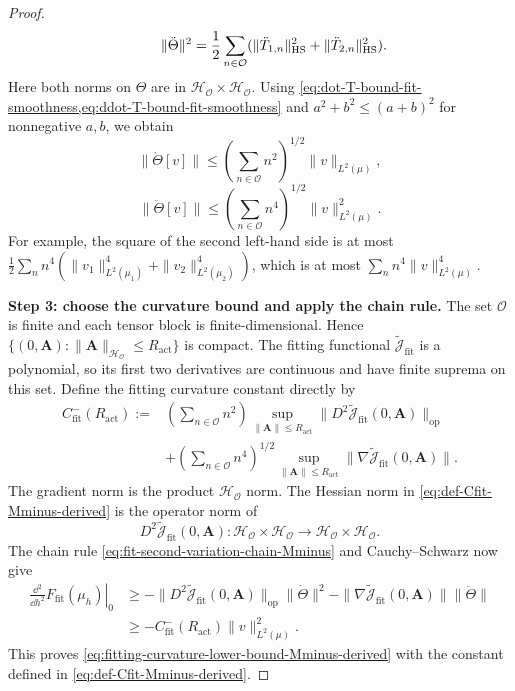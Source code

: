 \begin{proof}
\[ \qquad
 \|\ddot\Theta\|^2=\frac12\sum_{n\in\mathcal O}
       (\|\ddot T_{1,n}\|_{\mathrm{HS}}^2+\|\ddot T_{2,n}\|_{\mathrm{HS}}^2).
\]
Here both norms on \(\Theta\) are in
\(\mathcal H_{\mathcal O}\times\mathcal H_{\mathcal O}\).
Using \cref{eq:dot-T-bound-fit-smoothness,eq:ddot-T-bound-fit-smoothness}
and \(a^2+b^2\le(a+b)^2\) for nonnegative \(a,b\), we obtain
\begin{equation}
\label{eq:dot-Theta-bound-fit-smoothness}
 \|\dot\Theta[v]\|\le
 \left(\sum_{n\in\mathcal O}n^2\right)^{1/2}\|v\|_{L^2(\mu)},
\end{equation}
\begin{equation}
\label{eq:ddot-Theta-bound-fit-smoothness}
 \|\ddot\Theta[v]\|\le
 \left(\sum_{n\in\mathcal O}n^4\right)^{1/2}\|v\|_{L^2(\mu)}^2.
\end{equation}
For example, the square of the second left-hand side is at most
\(\tfrac12\sum_n n^4(\|v_1\|_{L^2(\mu_1)}^4+
\|v_2\|_{L^2(\mu_2)}^4)\), which is at most
\(\sum_n n^4\|v\|_{L^2(\mu)}^4\).


\par\noindent\textbf{Step 3: choose the curvature bound and apply the chain rule.}
The set \(\mathcal O\) is finite and each tensor block is finite-dimensional.
Hence
\(\{(0,\mathbf A):\|\mathbf A\|_{\mathcal H_{\mathcal O}}
\le R_{\mathrm{act}}\}\) is compact.  The fitting functional
\(\widetilde{\mathcal J}_{\mathrm{fit}}\) is a polynomial, so its first two
derivatives are continuous and have finite suprema on this set.
Define the fitting curvature constant directly by
\begin{equation}
\label{eq:def-Cfit-Mminus-derived}
\begin{aligned}
 C_{\mathrm{fit}}^-(R_{\mathrm{act}}):={}&
 \left(\sum_{n\in\mathcal O}n^2\right)
 \sup_{\|\mathbf A\|\le R_{\mathrm{act}}}
       \|D^2\widetilde{\mathcal J}_{\mathrm{fit}}(0,\mathbf A)\|_{\mathrm{op}}\\
 &+\left(\sum_{n\in\mathcal O}n^4\right)^{1/2}
 \sup_{\|\mathbf A\|\le R_{\mathrm{act}}}
       \|\nabla\widetilde{\mathcal J}_{\mathrm{fit}}(0,\mathbf A)\|.
\end{aligned}
\end{equation}
The gradient norm is the product \(\mathcal H_{\mathcal O}\) norm.
The Hessian norm in \cref{eq:def-Cfit-Mminus-derived} is the operator norm of
\[
 D^2\widetilde{\mathcal J}_{\mathrm{fit}}(0,\mathbf A):
 \mathcal H_{\mathcal O}\times\mathcal H_{\mathcal O}
 \longrightarrow
 \mathcal H_{\mathcal O}\times\mathcal H_{\mathcal O}.
\]
The chain rule \cref{eq:fit-second-variation-chain-Mminus} and
Cauchy--Schwarz now give
\[
\begin{aligned}
 \left.\frac{\dd^2}{\dd h^2}F_{\mathrm{fit}}(\mu_h)\right|_0
 &\ge-\|D^2\widetilde{\mathcal J}_{\mathrm{fit}}(0,\mathbf A)\|_{\mathrm{op}}
                   \|\dot\Theta\|^2
       -\|\nabla\widetilde{\mathcal J}_{\mathrm{fit}}(0,\mathbf A)\|
                   \|\ddot\Theta\|\\
 &\ge-C_{\mathrm{fit}}^-(R_{\mathrm{act}})\|v\|_{L^2(\mu)}^2.
\end{aligned}
\]
This proves \cref{eq:fitting-curvature-lower-bound-Mminus-derived} with
the constant defined in \cref{eq:def-Cfit-Mminus-derived}.
\end{proof}

